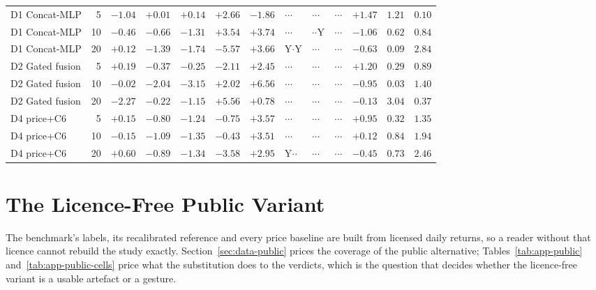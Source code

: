 \begin{table}[p]
\begin{tabular}{@{}lrrrrrrlllrrr@{}}
\addlinespace
D1 Concat-MLP & 5 & $-1.04$ & $+0.01$ & $+0.14$ & $+2.66$ & $-1.86$ & $\cdot$$\cdot$$\cdot$ & $\cdot$$\cdot$$\cdot$ & $\cdot$$\cdot$$\cdot$ & $+1.47$ & $1.21$ & $0.10$ \\
D1 Concat-MLP & 10 & $-0.46$ & $-0.66$ & $-1.31$ & $+3.54$ & $+3.74$ & $\cdot$$\cdot$$\cdot$ & $\cdot$$\cdot$Y & $\cdot$$\cdot$$\cdot$ & $-1.06$ & $0.62$ & $0.84$ \\
D1 Concat-MLP & 20 & $+0.12$ & $-1.39$ & $-1.74$ & $-5.57$ & $+3.66$ & Y$\cdot$Y & $\cdot$$\cdot$$\cdot$ & $\cdot$$\cdot$$\cdot$ & $-0.63$ & $0.09$ & $2.84$ \\
\addlinespace
D2 Gated fusion & 5 & $+0.19$ & $-0.37$ & $-0.25$ & $-2.11$ & $+2.45$ & $\cdot$$\cdot$$\cdot$ & $\cdot$$\cdot$$\cdot$ & $\cdot$$\cdot$$\cdot$ & $+1.20$ & $0.29$ & $0.89$ \\
D2 Gated fusion & 10 & $-0.02$ & $-2.04$ & $-3.15$ & $+2.02$ & $+6.56$ & $\cdot$$\cdot$$\cdot$ & $\cdot$$\cdot$$\cdot$ & $\cdot$$\cdot$$\cdot$ & $-0.95$ & $0.03$ & $1.40$ \\
D2 Gated fusion & 20 & $-2.27$ & $-0.22$ & $-1.15$ & $+5.56$ & $+0.78$ & $\cdot$$\cdot$$\cdot$ & $\cdot$$\cdot$$\cdot$ & $\cdot$$\cdot$$\cdot$ & $-0.13$ & $3.04$ & $0.37$ \\
\addlinespace
D4 price+C6 & 5 & $+0.15$ & $-0.80$ & $-1.24$ & $-0.75$ & $+3.57$ & $\cdot$$\cdot$$\cdot$ & $\cdot$$\cdot$$\cdot$ & $\cdot$$\cdot$$\cdot$ & $+0.95$ & $0.32$ & $1.35$ \\
D4 price+C6 & 10 & $-0.15$ & $-1.09$ & $-1.35$ & $-0.43$ & $+3.51$ & $\cdot$$\cdot$$\cdot$ & $\cdot$$\cdot$$\cdot$ & $\cdot$$\cdot$$\cdot$ & $+0.12$ & $0.84$ & $1.94$ \\
D4 price+C6 & 20 & $+0.60$ & $-0.89$ & $-1.34$ & $-3.58$ & $+2.95$ & Y$\cdot$$\cdot$ & $\cdot$$\cdot$$\cdot$ & $\cdot$$\cdot$$\cdot$ & $-0.45$ & $0.73$ & $2.46$ \\
\bottomrule
\end{tabular}
\end{table}

\clearpage
\FloatBarrier
\section{The Licence-Free Public Variant}
\label{app:res-public}

The benchmark's labels, its recalibrated reference and every price baseline
are built from licensed daily returns, so a reader without that licence
cannot rebuild the study exactly. Section~\ref{sec:data-public} prices the
coverage of the public alternative; Tables~\ref{tab:app-public}
and~\ref{tab:app-public-cells} price what the substitution does to the
verdicts, which is the question that decides whether the licence-free
variant is a usable artefact or a gesture.

